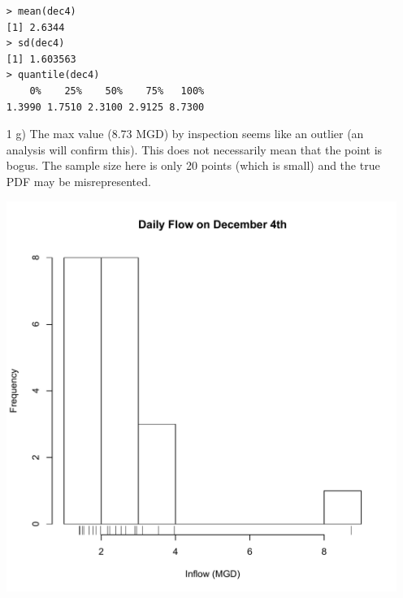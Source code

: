 \documentclass[11pt]{article}
\begin{document}
\begin{enumerate}
\begin{verbatim}
> mean(dec4)
[1] 2.6344
> sd(dec4)
[1] 1.603563
> quantile(dec4)
    0%    25%    50%    75%   100% 
1.3990 1.7510 2.3100 2.9125 8.7300 
\end{verbatim}

\item[1 g)] 
The max value (8.73 MGD) by inspection seems like an outlier (an analysis will confirm this). This does not necessarily mean that the point is bogus.  The sample size here is only 20 points (which is small) and the true PDF may be misrepresented.

\includegraphics[width=\textwidth]{hist.pdf}

\end{enumerate}
\end{document}
